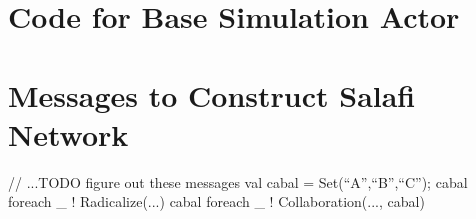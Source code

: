 \documentclass{article}
\newenvironment{rnwfig}[0]{\begin{figure}\begin{center}}{\end{center}\end{figure}}
\newcommand{\todoCP}[1]{\todo{CP, #1}}
\newcommand{\applabel}[1]{\label{app_#1}}
\begin{document}
% 
% 
% 
% 
% 

{}


\begin{appendices}
\section{Code for Base Simulation Actor}

\section{Messages to Construct Salafi Network}\applabel{sage_network}
\begin{code}
  // ...TODO figure out these messages
  val cabal = Set(``A'',``B'',``C'');
  cabal foreach { _ ! Radicalize(...) }
  cabal foreach { _ ! Collaboration(..., cabal) } 
\end{code}

\end{appendices}
\end{document}
